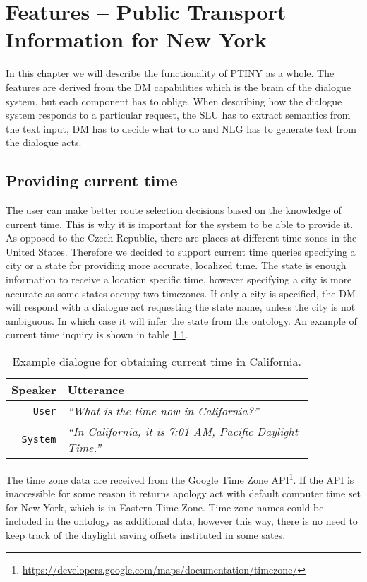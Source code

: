 \chapter{Features -- Public Transport Information for New York}

In this chapter we will describe the functionality of \ac{PTINY} as a whole.
The features are derived from the \ac{DM} capabilities which is the brain of the dialogue system, but each component has to oblige.
When describing how the dialogue system responds to a particular request, the \ac{SLU} has to extract semantics from the text input, \ac{DM} has to decide what to do and \ac{NLG} has to generate text from the dialogue acts.

\section{Providing current time} \label{sec:time}

The user can make better route selection decisions based on the knowledge of current time.
This is why it is important for the system to be able to provide it.
As opposed to the Czech Republic, there are places at different time zones in the United States.
Therefore we decided to support current time queries specifying a city or a state for providing more accurate, localized time.
The state is enough information to receive a location specific time, however specifying a city is more accurate as some states occupy two timezones.
If only a city is specified, the \ac{DM} will respond with a dialogue act requesting the state name, unless the city is not ambiguous.
In which case it will infer the state from the ontology.
An example of current time inquiry is shown in table \ref{table:time}.

\begin{table}[h]
\centering
\begin{tabular}{ | r | p{0.85\linewidth} | } \hline
	\textbf{Speaker} & \textbf{Utterance} \\ \hline
	\texttt{User} & \textit{``What is the time now in California?''} \\ \hline
	\texttt{System} & \textit{``In California, it is 7:01 AM, Pacific Daylight Time.''} \\ \hline
\end{tabular}
\caption[Current time in California]{Example dialogue for obtaining current time in California.}
\label{table:time}
\end{table}

The time zone data are received from the Google Time Zone \ac{API}\footnote{\url{https://developers.google.com/maps/documentation/timezone/}}.
If the \ac{API} is inaccessible for some reason it returns apology act with default computer time set for New York, which is in Eastern Time Zone.
Time zone names could be included in the ontology as additional data, however this way, there is no need to keep track of the daylight saving offsets instituted in some sates.

